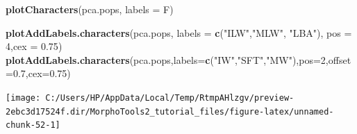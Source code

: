 \documentclass[
]{article}
\newenvironment{Shaded}{\begin{snugshade}}{\end{snugshade}}
\newcommand{\DataTypeTok}[1]{\textcolor[rgb]{0.13,0.29,0.53}{#1}}
\newcommand{\DecValTok}[1]{\textcolor[rgb]{0.00,0.00,0.81}{#1}}
\newcommand{\FloatTok}[1]{\textcolor[rgb]{0.00,0.00,0.81}{#1}}
\newcommand{\KeywordTok}[1]{\textcolor[rgb]{0.13,0.29,0.53}{\textbf{#1}}}
\newcommand{\NormalTok}[1]{#1}
\newcommand{\StringTok}[1]{\textcolor[rgb]{0.31,0.60,0.02}{#1}}
\begin{document}
\begin{Shaded}
\begin{Highlighting}[]
\KeywordTok{plotCharacters}\NormalTok{(pca.pops, }\DataTypeTok{labels =}\NormalTok{ F)}

\KeywordTok{plotAddLabels.characters}\NormalTok{(pca.pops, }\DataTypeTok{labels =} \KeywordTok{c}\NormalTok{(}\StringTok{"ILW"}\NormalTok{,}\StringTok{"MLW"}\NormalTok{, }\StringTok{"LBA"}\NormalTok{), }\DataTypeTok{pos =} \DecValTok{4}\NormalTok{,}\DataTypeTok{cex =} \FloatTok{0.75}\NormalTok{)}
\KeywordTok{plotAddLabels.characters}\NormalTok{(pca.pops,}\DataTypeTok{labels=}\KeywordTok{c}\NormalTok{(}\StringTok{"IW"}\NormalTok{,}\StringTok{"SFT"}\NormalTok{,}\StringTok{"MW"}\NormalTok{),}\DataTypeTok{pos=}\DecValTok{2}\NormalTok{,}\DataTypeTok{offset=}\FloatTok{0.7}\NormalTok{,}\DataTypeTok{cex=}\FloatTok{0.75}\NormalTok{)}
\end{Highlighting}
\end{Shaded}

\begin{center}\texttt{[image: C:/Users/HP/AppData/Local/Temp/RtmpAHlzgv/preview-2ebc3d17524f.dir/MorphoTools2\_tutorial\_files/figure-latex/unnamed-chunk-52-1]} \end{center}
\end{document}
